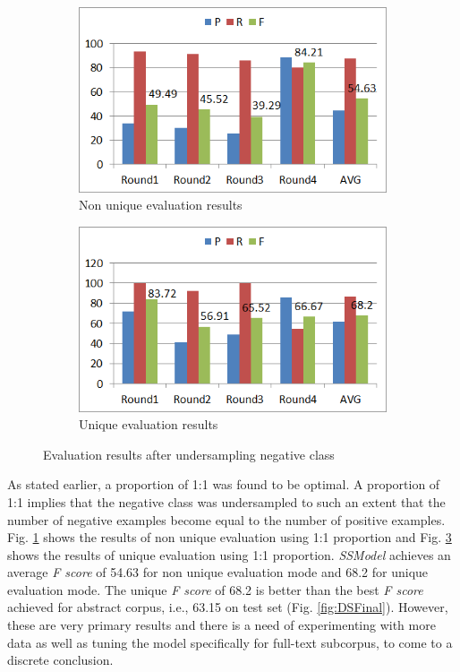 \begin{figure}
\centering
\begin{subfigure}{.5\textwidth}
  \centering
  \includegraphics[width=.95\linewidth]{figures/4_FTSameRatioResults.png}
  \caption{Non unique evaluation results}
  \label{fig:FT_ResUnderSampNonUniq}
\end{subfigure}%
\begin{subfigure}{.5\textwidth}
  \centering
  \includegraphics[width=.95\linewidth]{figures/4_FTSameRatioResults_Uniq.png}
  \caption{Unique evaluation results}
  \label{fig:FT_ResUnderSampUniq}
\end{subfigure}
\caption{Evaluation results after undersampling negative class}
\end{figure}

As stated earlier, a proportion of 1:1 was found to be optimal. A proportion of 1:1 implies that the negative class was undersampled to such an extent that the number of negative examples become equal to the number of positive examples. Fig. \ref{fig:FT_ResUnderSampNonUniq} shows the results of non unique evaluation using 1:1 proportion and Fig. \ref{fig:FT_ResUnderSampUniq} shows the results of unique evaluation using 1:1 proportion. \textit{SSModel} achieves an average \textit{F score} of 54.63 for non unique evaluation mode and 68.2 for unique evaluation mode. The unique \textit{F score} of 68.2 is better than the best \textit{F score} achieved for abstract corpus, i.e., 63.15 on test set (Fig. \ref{fig:DSFinal}). However, these are very primary results and there is a need of experimenting with more data as well as tuning the model specifically for full-text subcorpus, to come to a discrete conclusion.


